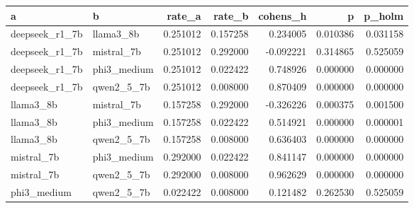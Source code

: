 \begin{tabular}{llrrrrr}
\toprule
a & b & rate\_a & rate\_b & cohens\_h & p & p\_holm \\
\midrule
deepseek\_r1\_7b & llama3\_8b & 0.251012 & 0.157258 & 0.234005 & 0.010386 & 0.031158 \\
deepseek\_r1\_7b & mistral\_7b & 0.251012 & 0.292000 & -0.092221 & 0.314865 & 0.525059 \\
deepseek\_r1\_7b & phi3\_medium & 0.251012 & 0.022422 & 0.748926 & 0.000000 & 0.000000 \\
deepseek\_r1\_7b & qwen2\_5\_7b & 0.251012 & 0.008000 & 0.870409 & 0.000000 & 0.000000 \\
llama3\_8b & mistral\_7b & 0.157258 & 0.292000 & -0.326226 & 0.000375 & 0.001500 \\
llama3\_8b & phi3\_medium & 0.157258 & 0.022422 & 0.514921 & 0.000000 & 0.000001 \\
llama3\_8b & qwen2\_5\_7b & 0.157258 & 0.008000 & 0.636403 & 0.000000 & 0.000000 \\
mistral\_7b & phi3\_medium & 0.292000 & 0.022422 & 0.841147 & 0.000000 & 0.000000 \\
mistral\_7b & qwen2\_5\_7b & 0.292000 & 0.008000 & 0.962629 & 0.000000 & 0.000000 \\
phi3\_medium & qwen2\_5\_7b & 0.022422 & 0.008000 & 0.121482 & 0.262530 & 0.525059 \\
\bottomrule
\end{tabular}
